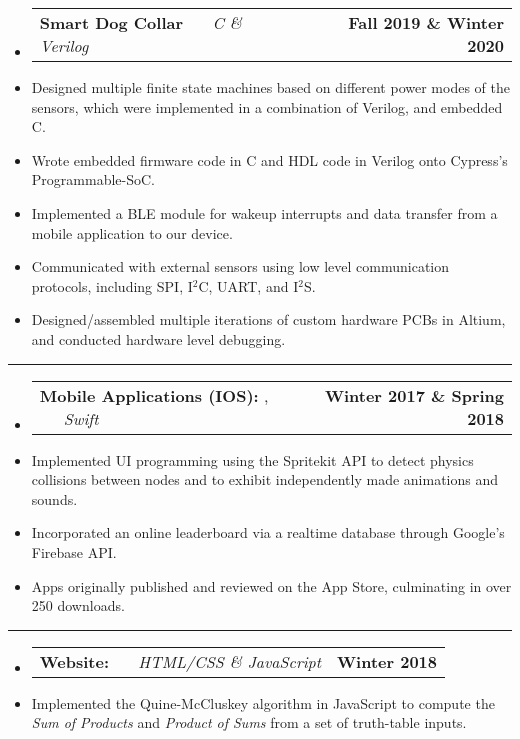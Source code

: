 \documentclass[10pt,letterpaper]{article}
\makeatletter
\newcommand{\header}[2]
{
	\begin{tabular*}{\linewidth}{l @{\extracolsep{\fill}} r}
		\hspace{-27pt} #1 & #2 \\
	\end{tabular*}
}
\makeatother
\begin{document}
\begin{itemize}
	\item[]
		\header
		{
			\textbf{Smart Dog Collar}
			\emph{\smash{Senior Design Project}} \ \ \ \footnotesize \emph{C \& Verilog}
		}
			{\textbf{Fall 2019 \& Winter 2020}}
		\item 
			Designed multiple finite state machines based on different power modes of the sensors, which were implemented in a combination of Verilog, and embedded C.
		\item 
			Wrote embedded firmware code in C and HDL code in Verilog onto Cypress's Programmable-SoC. 
		\item 
			Implemented a BLE module for wakeup interrupts and data transfer from a mobile application to our device. 
		\item 
			Communicated with external sensors using low level communication protocols, including SPI, I$^{2}$C, UART, and I$^{2}$S. 
		\item 
			Designed/assembled multiple iterations of custom hardware PCBs in Altium, and conducted hardware level debugging.

\end{itemize}

\hrule

\begin{itemize}
	\item[]
		\header
		{
			\textbf{Mobile Applications (IOS): }
			\href{https://appadvice.com/app/round-bound/1369632746}{\emph{\underline{\smash{Round 'a Bound}}}}, 
			\href{https://appadvice.com/app/tic-tac-emoji/1346934986}{\emph{\underline{\smash{Tic-Tac Emoji}}}} \ \ \ \footnotesize  \emph{Swift}
		}
			{\textbf{Winter 2017 \& Spring 2018}}
		\item 
			Implemented UI programming using the Spritekit API to detect physics collisions between nodes and to exhibit independently made animations and sounds.
		\item
			Incorporated an online leaderboard via a realtime database through Google's Firebase API.
		\item
			Apps originally published and reviewed on the App Store, culminating in over 250 downloads.
\end{itemize}

\hrule

\begin{itemize}
	\item[]
		\header
			{	
				\textbf{Website: }
				\href{https://aashpointo.github.io/KmapWebsite/}{\emph{\underline{\smash{aashpointo.github.io/KmapWebsite}}}} \ \ \ \footnotesize \emph{HTML/CSS \& JavaScript}
				}
				{\textbf{Winter 2018}}
		\item
			Implemented the Quine-McCluskey algorithm in JavaScript to compute the \emph{Sum of Products} and \emph{Product of Sums} from a set of truth-table inputs.

\end{itemize}
\end{document}
